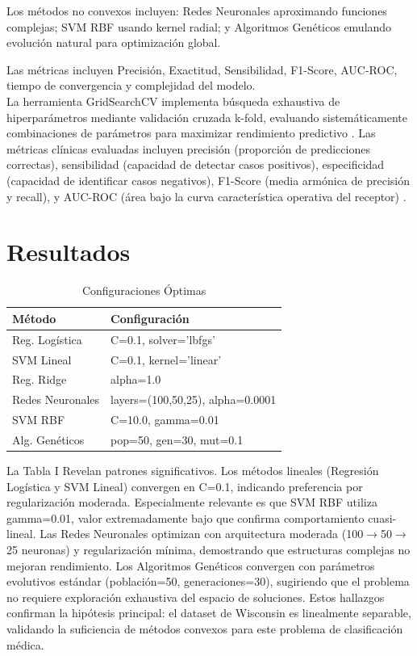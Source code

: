 \documentclass[conference]{IEEEtran}
\begin{document}
Los métodos no convexos \cite{nocedal2006} incluyen: Redes Neuronales \cite{goodfellow2016} aproximando funciones complejas; SVM RBF usando kernel radial; y Algoritmos Genéticos \cite{holland1992} emulando evolución natural para optimización global.

Las métricas incluyen Precisión, Exactitud, Sensibilidad, F1-Score, AUC-ROC, tiempo de convergencia y complejidad del modelo.\\ 
La herramienta GridSearchCV implementa búsqueda exhaustiva de hiperparámetros mediante validación cruzada k-fold, evaluando sistemáticamente combinaciones de parámetros para maximizar rendimiento predictivo \cite{bergstra2012}. Las métricas clínicas evaluadas incluyen precisión (proporción de predicciones correctas), sensibilidad (capacidad de detectar casos positivos), especificidad (capacidad de identificar casos negativos), F1-Score (media armónica de precisión y recall), y AUC-ROC (área bajo la curva característica operativa del receptor) \cite{fawcett2006}.
\section{Resultados}

\begin{table}[htbp]
\caption{Configuraciones Óptimas}
\begin{center}
\footnotesize
\begin{tabular}{|l|p{4.5cm}|}
\hline
\textbf{Método} & \textbf{Configuración} \\
\hline
Reg. Logística & C=0.1, solver='lbfgs' \\
\hline
SVM Lineal & C=0.1, kernel='linear' \\
\hline
Reg. Ridge & alpha=1.0 \\
\hline
Redes Neuronales & layers=(100,50,25), alpha=0.0001 \\
\hline
SVM RBF & C=10.0, gamma=0.01 \\
\hline
Alg. Genéticos & pop=50, gen=30, mut=0.1 \\
\hline
\end{tabular}
\label{tab1}
\end{center}
\end{table}

La Tabla I Revelan patrones significativos. Los métodos lineales (Regresión Logística y SVM Lineal) convergen en C=0.1, indicando preferencia por regularización moderada. Especialmente relevante es que SVM RBF utiliza gamma=0.01, valor extremadamente bajo que confirma comportamiento cuasi-lineal. Las Redes Neuronales optimizan con arquitectura moderada (100$\rightarrow$50$\rightarrow$25 neuronas) y regularización mínima, demostrando que estructuras complejas no mejoran rendimiento. Los Algoritmos Genéticos convergen con parámetros evolutivos estándar (población=50, generaciones=30), sugiriendo que el problema no requiere exploración exhaustiva del espacio de soluciones. Estos hallazgos confirman la hipótesis principal: el dataset de Wisconsin es linealmente separable, validando la suficiencia de métodos convexos para este problema de clasificación médica.
\end{document}
